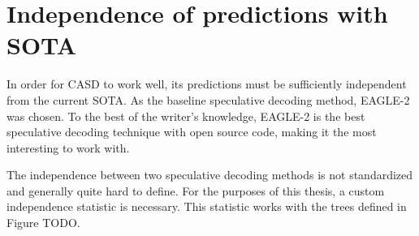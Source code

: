 \section{Independence of predictions with SOTA}
In order for CASD to work well, its predictions must be sufficiently independent from the current SOTA. As the baseline speculative decoding method, EAGLE-2 was chosen. To the best of the writer's knowledge, EAGLE-2 is the best speculative decoding technique with open source code, making it the most interesting to work with. 

The independence between two speculative decoding methods is not standardized and generally quite hard to define. For the purposes of this thesis, a custom independence statistic is necessary. This statistic works with the trees defined in Figure TODO.

\section{}